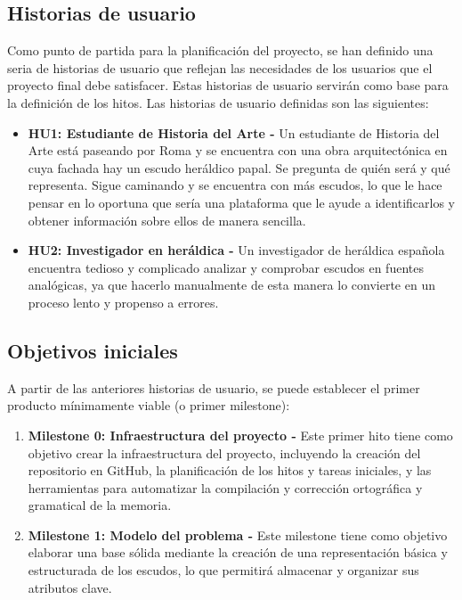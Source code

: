 \subsection{Historias de usuario}
Como punto de partida para la planificación del proyecto, se han definido una seria de 
historias de usuario que reflejan las necesidades de los usuarios que el proyecto final
debe satisfacer. Estas historias de usuario servirán como base para la definición de los hitos.
Las historias de usuario definidas son las siguientes:
\begin{itemize}
    \item \textbf{HU1: Estudiante de Historia del Arte - }Un estudiante de Historia del 
    Arte está paseando por Roma y se encuentra con una obra arquitectónica en cuya fachada
    hay un escudo heráldico papal. Se pregunta de quién será y qué representa. Sigue caminando 
    y se encuentra con más escudos, lo que le hace pensar en lo oportuna que sería una 
    plataforma que le ayude a identificarlos y obtener información sobre ellos de manera 
    sencilla.
    \item \textbf{HU2: Investigador en heráldica - }Un investigador de heráldica española
    encuentra tedioso y complicado analizar y comprobar escudos en fuentes analógicas, ya 
    que hacerlo manualmente de esta manera lo convierte en un proceso lento y propenso a 
    errores.
\end{itemize}

\subsection{Objetivos iniciales}
A partir de las anteriores historias de usuario, se puede establecer el primer
producto mínimamente viable (o primer milestone):
\begin{enumerate}
    \item \textbf{Milestone 0: Infraestructura del proyecto - }Este primer hito tiene como 
    objetivo crear la infraestructura del proyecto, incluyendo la creación del repositorio
    en GitHub, la planificación de los hitos y tareas iniciales, y las herramientas para automatizar
    la compilación y corrección ortográfica y gramatical de la memoria.
    \item \textbf{Milestone 1: Modelo del problema - }Este milestone tiene como objetivo
    elaborar una base sólida mediante la creación de una representación básica y estructurada
    de los escudos, lo que permitirá almacenar y organizar sus atributos clave.
\end{enumerate}

